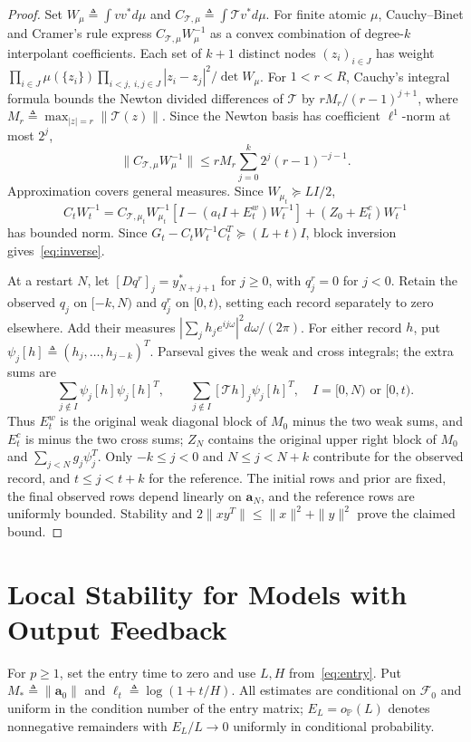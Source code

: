 \documentclass[11pt,reqno]{amsart}
\numberwithin{equation}{section}
\theoremstyle{definition}
\theoremstyle{remark}
\newcommand{\Prob}{\mathbb P}
\newcommand{\F}{\mathcal F}
\begin{document}
\begin{proof}
Set $W_\mu\triangleq\int vv^*d\mu$ and $C_{\mathcal T,\mu}\triangleq\int\mathcal T v^*d\mu$. For finite atomic $\mu$, Cauchy--Binet and Cramer's rule express $C_{\mathcal T,\mu}W_\mu^{-1}$ as a convex combination of degree-$k$ interpolant coefficients. Each set of $k+1$ distinct nodes $(z_i)_{i\in J}$ has weight $\prod_{i\in J}\mu(\{z_i\})\prod_{i<j,\ i,j\in J}|z_i-z_j|^2/\det W_\mu$. For $1<r<R$, Cauchy's integral formula bounds the Newton divided differences of $\mathcal T$ by $rM_r/(r-1)^{j+1}$, where $M_r\triangleq\max_{|z|=r}\|\mathcal T(z)\|$. Since the Newton basis has coefficient $\ell^1$-norm at most $2^j$,
\[
 \|C_{\mathcal T,\mu}W_\mu^{-1}\|\le rM_r\sum_{j=0}^k2^j(r-1)^{-j-1}.
\]
Approximation covers general measures. Since $W_{\mu_t}\succeq LI/2$,
\[
 C_tW_t^{-1}=C_{\mathcal T,\mu_t}W_{\mu_t}^{-1}
 [I-(a_tI+E_t^w)W_t^{-1}]+(Z_0+E_t^c)W_t^{-1}
\]
has bounded norm. Since $G_t-C_tW_t^{-1}C_t^T\succeq(L+t)I$, block inversion gives~\eqref{eq:inverse}.

At a restart $N$, let $[Dq^r]_j=y^*_{N+j+1}$ for $j\ge0$, with $q_j^r=0$ for $j<0$. Retain the observed $q_j$ on $[-k,N)$ and $q_j^r$ on $[0,t)$, setting each record separately to zero elsewhere. Add their measures $|\sum_j h_je^{ij\omega}|^2d\omega/(2\pi)$. For either record $h$, put $\psi_j[h]\triangleq(h_j,\ldots,h_{j-k})^T$. Parseval gives the weak and cross integrals; the extra sums are
\[
 \sum_{j\notin I}\psi_j[h]\psi_j[h]^T,\qquad
 \sum_{j\notin I}[\mathcal T h]_j\psi_j[h]^T,
 \quad I=[0,N)\text{ or }[0,t).
\]
Thus $E_t^w$ is the original weak diagonal block of $M_0$ minus the two weak sums, and $E_t^c$ is minus the two cross sums; $Z_N$ contains the original upper right block of $M_0$ and $\sum_{j<N}g_j\psi_j^T$. Only $-k\le j<0$ and $N\le j<N+k$ contribute for the observed record, and $t\le j<t+k$ for the reference. The initial rows and prior are fixed, the final observed rows depend linearly on $\mathbf a_N$, and the reference rows are uniformly bounded. Stability and $2\|xy^T\|\le\|x\|^2+\|y\|^2$ prove the claimed bound.
\end{proof}

\section{Local Stability for Models with Output Feedback}\label{sec:local}
For $p\ge1$, set the entry time to zero and use $L,H$ from~\eqref{eq:entry}. Put $M_*\triangleq\|\mathbf a_0\|$ and $\ell_t\triangleq\log(1+t/H)$. All estimates are conditional on $\F_0$ and uniform in the condition number of the entry matrix; $E_L=o_{\Prob}(L)$ denotes nonnegative remainders with $E_L/L\to0$ uniformly in conditional probability.
\end{document}
